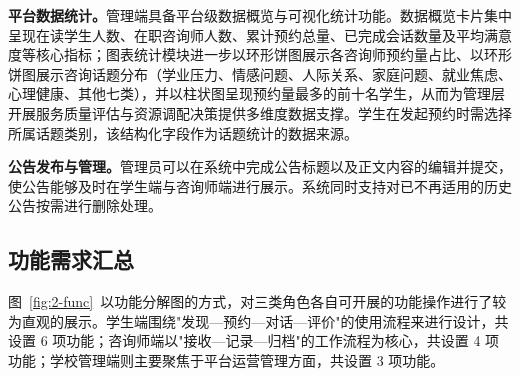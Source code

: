 \textbf{平台数据统计。}管理端具备平台级数据概览与可视化统计功能。数据概览卡片集中呈现在读学生人数、在职咨询师人数、累计预约总量、已完成会话数量及平均满意度等核心指标；图表统计模块进一步以环形饼图展示各咨询师预约量占比、以环形饼图展示咨询话题分布（学业压力、情感问题、人际关系、家庭问题、就业焦虑、心理健康、其他七类），并以柱状图呈现预约量最多的前十名学生，从而为管理层开展服务质量评估与资源调配决策提供多维度数据支撑。学生在发起预约时需选择所属话题类别，该结构化字段作为话题统计的数据来源。

\textbf{公告发布与管理。}管理员可以在系统中完成公告标题以及正文内容的编辑并提交，使公告能够及时在学生端与咨询师端进行展示。系统同时支持对已不再适用的历史公告按需进行删除处理。

\subsection{功能需求汇总}

图~\ref{fig:2-func}~以功能分解图的方式，对三类角色各自可开展的功能操作进行了较为直观的展示。学生端围绕"发现—预约—对话—评价"的使用流程来进行设计，共设置 6 项功能；咨询师端以"接收—记录—归档"的工作流程为核心，共设置 4 项功能；学校管理端则主要聚焦于平台运营管理方面，共设置 3 项功能。


